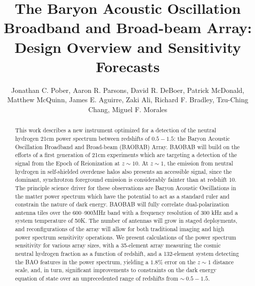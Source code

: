 \documentclass[10pt,iop]{emulateapj}
\begin{document}
\title{The Baryon Acoustic Oscillation Broadband and Broad-beam Array: Design Overview and Sensitivity Forecasts}
\author{Jonathan C. Pober, 
Aaron R. Parsons, 
David R. DeBoer,
Patrick McDonald,
Matthew McQuinn,
James E. Aguirre,
Zaki Ali,
Richard F. Bradley,
Tzu-Ching Chang,
Miguel F. Morales}


\begin{abstract}
This work describes a new instrument optimized for a detection of
the neutral hydrogen 21cm power spectrum between redshifts of $0.5-1.5$: the 
Baryon Acoustic Oscillation Broadband and Broad-beam (BAOBAB) Array.  
BAOBAB will build on the efforts of a first generation of 21cm experiments
which are targeting a detection of the signal from the Epoch of Reionization at
$z\sim10$.  
At $z\sim1$, the emission from neutral hydrogen 
in self-shielded overdense halos also presents an accessible signal, 
since the dominant, synchrotron foreground emission is considerably fainter
than at redshift 10.  The principle science driver for these observations are
Baryon Acoustic Oscillations in the matter power spectrum
which have the potential to act as a standard ruler and constrain the nature of dark energy.
BAOBAB will fully correlate
dual-polarization antenna tiles over the 600--900MHz band with a frequency resolution of 
300 kHz and a system temperature of 50K.  The number of antennas will grow in 
staged deployments, and reconfigurations of the array
will allow for both traditional imaging and high power spectrum sensitivity operations.  We present
calculations of the power spectrum sensitivity for various array sizes, 
with a 35-element array measuring the cosmic neutral hydrogen 
fraction as a function of redshift, 
and a 132-element system detecting the BAO features in the power spectrum,
yielding a $1.8\%$ error on the $z\sim1$ distance scale, and, in turn, significant
improvements to constraints on the dark energy equation of state over an
unprecedented range of redshifts from $\sim~0.5-1.5$.
\end{abstract}
\end{document}
